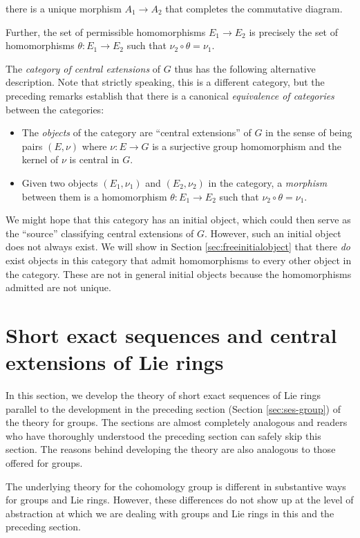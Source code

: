 \documentclass{ucetd}
\begin{document}
there is a unique morphism $A_1 \to A_2$ that completes the
commutative diagram.

Further, the set of permissible homomorphisms
$E_1 \to E_2$ is precisely the set of homomorphisms $\theta: E_1 \to
E_2$ such that $\nu_2 \circ \theta = \nu_1$.

The {\em category of central extensions} of $G$ thus has the following
alternative description. Note that strictly speaking, this is a
different category, but the preceding remarks establish that there is
a canonical {\em equivalence of categories} between the categories:

\begin{itemize}
\item The {\em objects} of the category are ``central extensions'' of
  $G$ in the sense of being pairs $(E,\nu)$ where $\nu:E \to G$ is a
  surjective group homomorphism and the kernel of $\nu$ is central in $G$.
\item Given two objects $(E_1,\nu_1)$ and $(E_2,\nu_2)$ in the
  category, a {\em morphism} between them is a homomorphism $\theta:
  E_1 \to E_2$ such that $\nu_2 \circ \theta = \nu_1$.
\end{itemize}

We might hope that this category has an initial object, which could
then serve as the ``source'' classifying central extensions of
$G$. However, such an initial object does not always exist. We will
show in Section \ref{sec:freeinitialobject} that there {\em do} exist
objects in this category that admit homomorphisms to every other
object in the category. These are not in general initial objects
because the homomorphisms admitted are not unique.

\section{Short exact sequences and central extensions of Lie rings}\label{sec:ses-lie}

In this section, we develop the theory of short exact sequences of Lie
rings parallel to the development in the preceding section (Section
\ref{sec:ses-group}) of the theory for groups. The sections are
almost completely analogous and readers who have thoroughly understood
the preceding section can safely skip this section. The reasons behind
developing the theory are also analogous to those offered for groups.

The underlying theory for the cohomology group is different in
substantive ways for groups and Lie rings. However, these differences
do not show up at the level of abstraction at which we are dealing
with groups and Lie rings in this and the preceding section.
\end{document}
